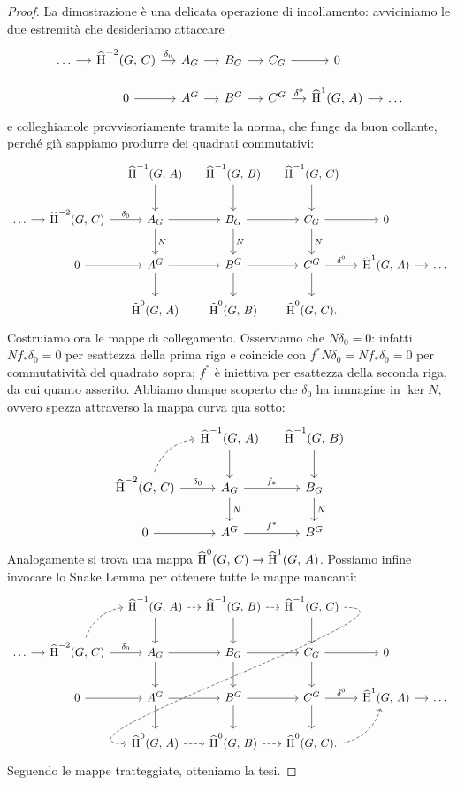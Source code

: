\begin{proof}
	La dimostrazione è una delicata operazione di incollamento: avviciniamo le due estremità che desideriamo attaccare
	\[\begin{tikzcd}[column sep = small, row sep = small]
	\dots \rar
	& \Hh^{-2}(G, \, C) \rar["\delta_0"]
	& A_G \rar
	& B_G \rar
	& C_G \rar
	& 0 & \\
	& 0 \rar
	&A^G \rar
	& B^G \rar
	& C^G \rar["\delta^0"]
	& \Hh^1(G, \, A) \rar
	& \dots \end{tikzcd}\]
	e colleghiamole provvisoriamente tramite la norma, che funge da buon collante, perché già sappiamo produrre dei quadrati commutativi:
	\[\begin{tikzcd}[column sep = small]
	&& \Hh^{-1}(G, \, A) \dar 
	& \Hh^{-1}(G, \, B) \dar 
	& \Hh^{-1}(G, \, C) \dar
	&& \\
	\dots \rar
	& \Hh^{-2}(G, \, C) \rar["\delta_0"]
	& A_G \rar \dar{N} 
	& B_G \rar \dar{N}
	& C_G \rar \dar{N}
	& 0 & \\
	& 0 \rar
	&A^G \rar\dar
	& B^G \rar\dar
	& C^G \rar["\delta^0"]\dar
	& \Hh^1(G, \, A) \rar
	& \dots \\
	&& \Hh^{0}(G, \, A) 
	& \Hh^{0}(G, \, B)  
	& \Hh^{0}(G, \, C).
	&&
	\end{tikzcd}\]
	Costruiamo ora le mappe di collegamento. Osserviamo che $ N\delta_0 = 0 $: infatti $ Nf_*\delta_0 = 0 $ per esattezza della prima riga e coincide con $ f^*N\delta_0 = Nf_*\delta_0 = 0 $ per commutatività del quadrato sopra; $ f^* $ è iniettiva per esattezza della seconda riga, da cui quanto asserito. Abbiamo dunque scoperto che $ \delta_0 $ ha immagine in $ \ker N $, ovvero spezza attraverso la mappa curva qua sotto:
	\[\begin{tikzcd}[column sep = small]
	& \Hh^{-1}(G, \, A) \dar
	& \Hh^{-1}(G, \, B) \dar \\
	\Hh^{-2}(G, \, C) \rar["\delta_0"] \arrow[ur, dashed, bend left = 30]
	& A_G \rar["f_*"] \dar{N} 
	& B_G \arrow[d, "N"]\\
	0 \rar
	&A^G \rar["f^*"]
	& B^G
	\end{tikzcd}\]
	Analogamente si trova una mappa $ \operatorname{\widehat{H}}^0(G, \, C) \to \operatorname{\widehat{H}}^1(G, \, A) $. Possiamo infine invocare lo Snake Lemma per ottenere tutte le mappe mancanti:
	\[\begin{tikzcd}[column sep = small]
	&& \Hh^{-1}(G, \, A) \dar \rar[dashed]
	& \Hh^{-1}(G, \, B) \dar \rar[dashed]
	& \Hh^{-1}(G, \, C) \dar \ar[out=0, in=180, looseness=1, dashed]{dddll} %
	&& \\
	\dots \rar
	& \Hh^{-2}(G, \, C) \rar["\delta_0"] \arrow[ur, dashed, bend left = 30]
	& A_G \rar \dar 
	& B_G \rar \arrow[d]
	& C_G \rar \dar
	& 0 & \\
	& 0 \rar
	&A^G \rar\dar
	& B^G \rar\dar
	& C^G \rar["\delta^0"]\dar
	& \Hh^1(G, \, A) \rar
	& \dots \\
	&& \Hh^{0}(G, \, A) \rar[dashed]
	& \Hh^{0}(G, \, B)  \rar[dashed]
	& \Hh^{0}(G, \, C). \arrow[ur, dashed, bend right = 30]
	&&
	\end{tikzcd}\]
	Seguendo le mappe tratteggiate, otteniamo la tesi.
\end{proof}

